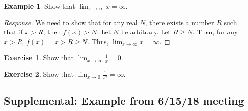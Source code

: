 \documentclass[english]{book}
\theoremstyle{remark}
\theoremstyle{definition}
\newtheorem{excs}{Exercise}[chapter]
\newtheorem{exle}[theorem]{Example}
\newtheorem*{next week}{Next Week}
\newcommand{\dlim}{\displaystyle\lim}
\begin{document}
\begin{exle}
	Show that $\dlim_{x\to \infty} x=\infty$.
\end{exle}
\begin{proof}[Response]
	We need to show that for any real $N$, there exists a number $R$ such that if $x>R$, then $f(x)>N$. Let $N$ be arbitrary. Let $R\geq N$. Then, for any $x>R$, $f(x)=x>R\geq N$. Thus, $\lim_{x\to \infty}x=\infty$. 
\end{proof}
\begin{excs}
	Show that $\dlim_{x\to \infty} \frac{1}{x}=0$. 
\end{excs}
\begin{excs}Show that $\dlim_{x\to 0}\frac{1}{x^2}=\infty$. 
\end{excs}
\subsection{Supplemental: Example from 6/15/18 meeting}
\end{document}
